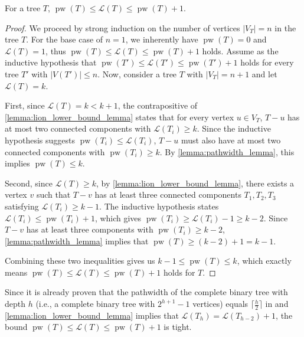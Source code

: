 \documentclass[a4paper,UKenglish,cleveref, autoref, thm-restate]{lipics-v2021}
\begin{document}
\begin{theorem}\label{theorem:pathwidth_theorem}
For a tree $T$, $\operatorname{pw}(T) \leq \mathcal{L}(T) \leq \operatorname{pw}(T)+1$.
\end{theorem}
\begin{proof}
We proceed by strong induction on the number of vertices $|V_T|=n$ in the tree $T$. For the base case of $n=1$, we inherently have $\operatorname{pw}(T)=0$ and $\mathcal{L}(T)=1$, thus $\operatorname{pw}(T)\leq \mathcal{L}(T)\leq \operatorname{pw}(T)+1$ holds. Assume as the inductive hypothesis that $\operatorname{pw}(T') \leq \mathcal{L}(T') \leq \operatorname{pw}(T')+1$ holds for every tree $T'$ with $|V(T')|\leq n$. Now, consider a tree $T$ with $|V_T|=n+1$ and let $\mathcal{L}(T)=k$.

First, since $\mathcal{L}(T)=k < k+1$, the contrapositive of \cref{lemma:lion_lower_bound_lemma} states that for every vertex $u \in V_T$, $T - u$ has at most two connected components with $\mathcal{L}(T_i) \geq k$. Since the inductive hypothesis suggests $\operatorname{pw}(T_i) \leq \mathcal{L}(T_i)$, $T - u$ must also have at most two connected components with $\operatorname{pw}(T_i) \geq k$. By \cref{lemma:pathwidth_lemma}, this implies $\operatorname{pw}(T) \leq k$.

Second, since $\mathcal{L}(T) \geq k$, by \cref{lemma:lion_lower_bound_lemma}, there exists a vertex $v$ such that $T -v$ has at least three connected components $T_1, T_2, T_3$ satisfying $\mathcal{L}(T_i) \geq k-1$. The inductive hypothesis states $\mathcal{L}(T_i) \leq \operatorname{pw}(T_i)+1$, which gives $\operatorname{pw}(T_i) \geq \mathcal{L}(T_i)-1 \geq k-2$. Since $T -v$ has at least three components with $\operatorname{pw}(T_i) \geq k-2$, \cref{lemma:pathwidth_lemma} implies that $\operatorname{pw}(T) \geq (k-2)+1 = k-1$.

Combining these two inequalities gives us $k-1 \leq \operatorname{pw}(T) \leq k$, which exactly means $\operatorname{pw}(T) \leq \mathcal{L}(T) \leq \operatorname{pw}(T)+1$ holds for $T$.
\end{proof}


\begin{remark}
Since it is already proven that the pathwidth of the complete binary tree with depth $h$ (i.e., a complete binary tree with $2^{h+1}-1$ vertices) equals $\lceil \frac{h}{2} \rceil$ in \cite{bodlaender1998partial} and \cref{lemma:lion_lower_bound_lemma} implies that $\mathcal{L}(T_h)=\mathcal{L}(T_{h-2})+1$, the bound $\operatorname{pw}(T)\leq \mathcal{L}(T)\leq \operatorname{pw}(T)+1$ is tight.
\end{remark}
\end{document}
